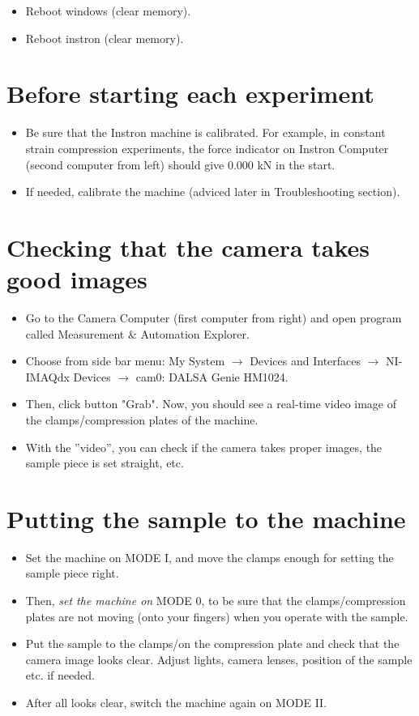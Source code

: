\documentclass[a4paper]{article}
\begin{document}
\begin{itemize}
  \item Reboot windows (clear memory).
  \item Reboot instron (clear memory).
\end{itemize}

\section{Before starting each experiment}

\begin{itemize}
  \item Be sure that the Instron machine is calibrated. For example, in constant strain compression experiments, the force indicator on Instron Computer (second computer from left) should give 0.000 kN in the start.
  \item If needed, calibrate the machine (adviced later in Troubleshooting section).
\end{itemize}

\section{Checking that the camera takes good images}

\begin{itemize}
  \item Go to the Camera Computer (first computer from right) and open program called Measurement \& Automation Explorer.
  \item Choose from side bar menu: My System $\rightarrow$ Devices and Interfaces $\rightarrow$ NI-IMAQdx Devices $\rightarrow$ cam0: DALSA Genie HM1024.
  \item Then, click button "Grab". Now, you should see a real-time video image of the clamps/compression plates of the machine.
  \item With the ''video'', you can check if the camera takes proper images, the sample piece is set straight, etc.
\end{itemize}

\section{Putting the sample to the machine}

\begin{itemize}
  \item Set the machine on \textsf{MODE I}, and move the clamps enough for setting the sample piece right.
  \item Then, \textit{set the machine on} \textsf{MODE 0}, to be sure that the clamps/compression plates are not moving (onto your fingers) when you operate with the sample.
  \item Put the sample to the clamps/on the compression plate and check that the camera image looks clear. Adjust lights, camera lenses, position of the sample etc. if needed.
  \item After all looks clear, switch the machine again on \textsf{MODE II}.
\end{itemize}
\end{document}
